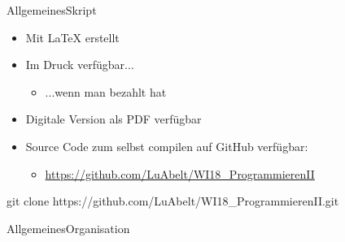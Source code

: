 
	
	
	

\begin{frame}{Allgemeines}{Skript}
	\begin{minipage}{0.8\textwidth}
	\begin{itemize}
		\item Mit \LaTeX{} erstellt
		\item Im Druck verfügbar...
		\begin{itemize}
			\item ...wenn man bezahlt hat
		\end{itemize}
		\item Digitale Version als PDF verfügbar
		\item Source Code zum selbst compilen auf GitHub verfügbar:
		\begin{itemize}
			\item \url{https://github.com/LuAbelt/WI18_ProgrammierenII}
		\end{itemize}
	\end{itemize}
	\begin{box}
		git clone https://github.com/LuAbelt/WI18_ProgrammierenII.git
	\end{box}
	\end{minipage}%
	\begin{minipage}{0.2\textwidth}
	\end{minipage}
\end{frame}

\begin{frame}{Allgemeines}{Organisation}
	\begin{itemize}
	\end{itemize}
\end{frame}